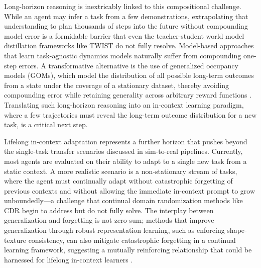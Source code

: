 \documentclass[11pt]{article}
\begin{document}
Long-horizon reasoning is inextricably linked to this compositional challenge. While an agent may infer a task from a few demonstrations, extrapolating that understanding to plan thousands of steps into the future without compounding model error is a formidable barrier that even the teacher-student world model distillation frameworks like TWIST do not fully resolve. Model-based approaches that learn task-agnostic dynamics models naturally suffer from compounding one-step errors. A transformative alternative is the use of generalized occupancy models (GOMs), which model the distribution of all possible long-term outcomes from a state under the coverage of a stationary dataset, thereby avoiding compounding error while retaining generality across arbitrary reward functions \cite{ref416}. Translating such long-horizon reasoning into an in-context learning paradigm, where a few trajectories must reveal the long-term outcome distribution for a new task, is a critical next step.

Lifelong in-context adaptation represents a further horizon that pushes beyond the single-task transfer scenarios discussed in sim-to-real pipelines. Currently, most agents are evaluated on their ability to adapt to a single new task from a static context. A more realistic scenario is a non-stationary stream of tasks, where the agent must continually adapt without catastrophic forgetting of previous contexts and without allowing the immediate in-context prompt to grow unboundedly---a challenge that continual domain randomization methods like CDR begin to address but do not fully solve. The interplay between generalization and forgetting is not zero-sum; methods that improve generalization through robust representation learning, such as enforcing shape-texture consistency, can also mitigate catastrophic forgetting in a continual learning framework, suggesting a mutually reinforcing relationship that could be harnessed for lifelong in-context learners \cite{ref417}.
\end{document}
